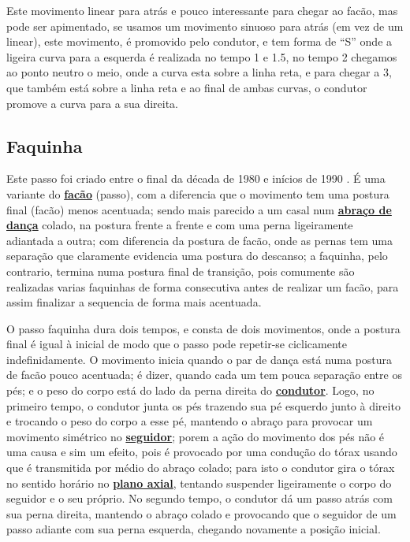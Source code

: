 Este movimento linear para atrás e pouco interessante para chegar ao facão, mas pode ser apimentado,
se usamos um movimento sinuoso para atrás (em vez de um linear), este movimento,
é promovido pelo condutor, e tem forma de ``S'' onde a ligeira curva para a esquerda é realizada no tempo 1 e 1.5,
no tempo  2 chegamos ao ponto neutro o meio, onde a curva esta sobre a linha reta, e para chegar a 3, 
que também está sobre a linha reta e ao final de ambas curvas,
o condutor promove a curva para a sua direita.

\subsection{Faquinha}
Este passo foi  criado entre o final da década de 1980 e inícios de 1990  \cite[pp. 143]{perna2002samba}.
É uma variante do  \hyperref[subsec:desc:passo:facao]{\textbf{facão}} (passo), 
com a diferencia que o movimento tem uma postura final (facão) menos acentuada;
sendo mais parecido a um casal num \hyperref[def:abracodedanca]{\textbf{abraço de dança}} colado, 
na postura frente a frente  e com uma perna ligeiramente adiantada a outra;
com diferencia da postura de facão, 
onde as pernas tem uma separação que claramente evidencia uma postura do descanso;
a faquinha, pelo contrario, termina numa postura final de transição, 
pois comumente são realizadas varias faquinhas de forma consecutiva antes de realizar um facão,
 para assim finalizar a sequencia de forma mais acentuada.

O passo faquinha dura dois tempos, e consta de dois movimentos, 
onde a postura final é igual à inicial de modo que o passo pode repetir-se ciclicamente indefinidamente.
O movimento inicia quando o par de dança está numa postura de facão pouco acentuada;
é dizer, quando cada um tem pouca separação entre os pés; 
e o peso do corpo está do lado da perna direita do \hyperref[def:Condutor]{\textbf{condutor}}.
Logo, no primeiro tempo, 
o condutor junta os pés trazendo sua pé esquerdo junto à direito e trocando o peso do corpo a esse pé,
mantendo o abraço para provocar um movimento simétrico no \hyperref[def:Seguidor]{\textbf{seguidor}};
porem a ação do movimento dos pés não é uma causa e sim um efeito,
pois é provocado por uma condução do tórax usando que é transmitida por médio do abraço colado;
para isto o condutor gira o tórax no sentido horário no \hyperref[def:PlanoAxial]{\textbf{plano axial}},
tentando suspender ligeiramente o corpo do seguidor e o seu próprio.
No segundo tempo, o condutor dá um passo atrás com sua perna direita,
 mantendo o abraço colado e provocando que o seguidor de um passo adiante com sua perna esquerda,
chegando novamente a posição inicial.




